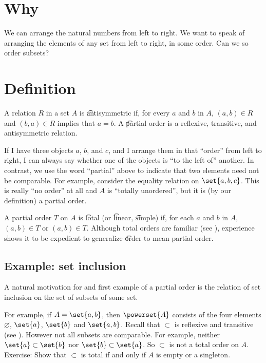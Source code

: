 
\section*{Why}

We can arrange the natural numbers from left to right.
We want to speak of arranging the elements of any set from left to right, in some order.
Can we so order subsets?

\section*{Definition}

A relation $R$ in a set $A$ is \t{antisymmetric} if, for every $a$ and $b$ in $A$, $(a, b) \in R$ and $(b, a) \in R$ implies that $a = b$.
A \t{partial order} is a reflexive, transitive, and antisymmetric relation.

If I have three objects $a$, $b$, and $c$, and I arrange them in that ``order'' from left to right, I can always say whether one of the objects is ``to the left of'' another.
In contrast, we use the word ``partial'' above to indicate that two elements need not be comparable.
For example, consider the equality relation on $\set{a, b, c}$.
This is really ``no order'' at all and $A$ is ``totally unordered'', but it is (by our definition) a partial order.

A partial order $T$ on $A$ is \t{total} (or \t{linear}, \t{simple}) if, for each $a$ and $b$ in $A$, $(a, b) \in T$ or $(a, b) \in T$.
Although total orders are familiar (see ), experience shows it to be expedient to generalize \t{order} to mean partial order.

\subsection*{Example: set inclusion}

A natural motivation for and first example of a partial order is the relation of set inclusion on the set of subsets of some set.

For example, if $A = \set{a, b}$, then $\powerset{A}$ consists of the four elements $\varnothing$, $\set{a}$, $\set{b}$ and $\set{a,b}$.
Recall that $\subset$ is reflexive and transitive (see ).
However not all subsets are comparable.
For example, neither $\set{a} \subset \set{b}$ nor $\set{b} \subset \set{a}$.
So $\subset$ is not a total order on $A$.
Exercise: Show that $\subset$ is total if and only if $A$ is empty or a singleton.

